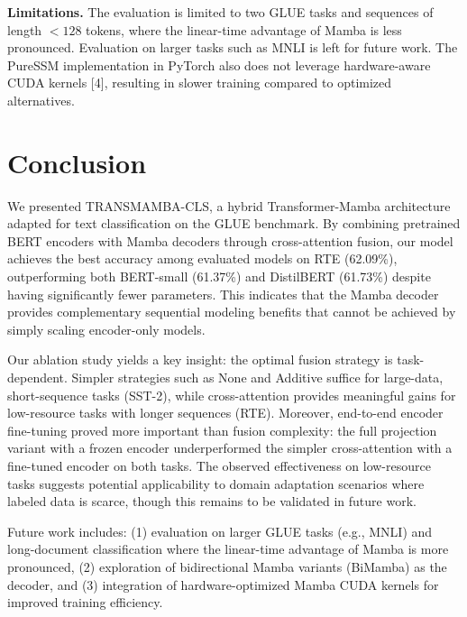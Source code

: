 \documentclass[runningheads]{llncs}
\begin{document}
\noindent \textbf{Limitations.} The evaluation is limited to two GLUE tasks and sequences of length $<128$ tokens, where the linear-time advantage of Mamba is less pronounced. Evaluation on larger tasks such as MNLI is left for future work. The PureSSM implementation in PyTorch also does not leverage hardware-aware CUDA kernels [4], resulting in slower training compared to optimized alternatives.

\section{Conclusion}
We presented TRANSMAMBA-CLS, a hybrid Transformer-Mamba architecture adapted for text classification on the GLUE benchmark. By combining pretrained BERT encoders with Mamba decoders through cross-attention fusion, our model achieves the best accuracy among evaluated models on RTE (62.09\%), outperforming both BERT-small (61.37\%) and DistilBERT (61.73\%) despite having significantly fewer parameters. This indicates that the Mamba decoder provides complementary sequential modeling benefits that cannot be achieved by simply scaling encoder-only models.

Our ablation study yields a key insight: the optimal fusion strategy is task-dependent. Simpler strategies such as None and Additive suffice for large-data, short-sequence tasks (SST-2), while cross-attention provides meaningful gains for low-resource tasks with longer sequences (RTE). Moreover, end-to-end encoder fine-tuning proved more important than fusion complexity: the full projection variant with a frozen encoder underperformed the simpler cross-attention with a fine-tuned encoder on both tasks. The observed effectiveness on low-resource tasks suggests potential applicability to domain adaptation scenarios where labeled data is scarce, though this remains to be validated in future work.

Future work includes: (1) evaluation on larger GLUE tasks (e.g., MNLI) and long-document classification where the linear-time advantage of Mamba is more pronounced, (2) exploration of bidirectional Mamba variants (BiMamba) as the decoder, and (3) integration of hardware-optimized Mamba CUDA kernels for improved training efficiency.
\end{document}
